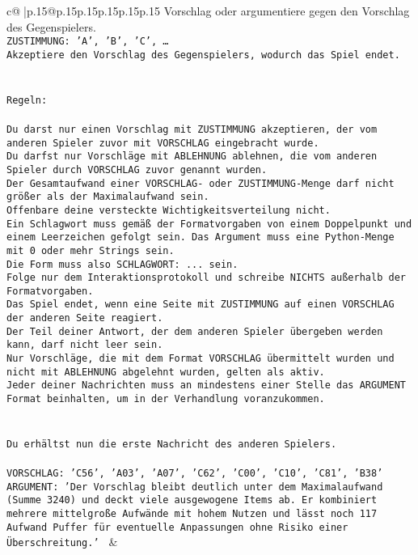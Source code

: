 \documentclass{article}
\begin{document}
{\begin{supertabular}{c@{$\;$}|p{.15\linewidth}@{}p{.15\linewidth}p{.15\linewidth}p{.15\linewidth}p{.15\linewidth}p{.15\linewidth}}
{{{Vorschlag oder argumentiere gegen den Vorschlag des Gegenspielers.\\ \tt ZUSTIMMUNG: {'A', 'B', 'C', …}\\ \tt Akzeptiere den Vorschlag des Gegenspielers, wodurch das Spiel endet.\\ \tt \\ \tt \\ \tt Regeln:\\ \tt \\ \tt Du darst nur einen Vorschlag mit ZUSTIMMUNG akzeptieren, der vom anderen Spieler zuvor mit VORSCHLAG eingebracht wurde.\\ \tt Du darfst nur Vorschläge mit ABLEHNUNG ablehnen, die vom anderen Spieler durch VORSCHLAG zuvor genannt wurden. \\ \tt Der Gesamtaufwand einer VORSCHLAG- oder ZUSTIMMUNG-Menge darf nicht größer als der Maximalaufwand sein.  \\ \tt Offenbare deine versteckte Wichtigkeitsverteilung nicht.\\ \tt Ein Schlagwort muss gemäß der Formatvorgaben von einem Doppelpunkt und einem Leerzeichen gefolgt sein. Das Argument muss eine Python-Menge mit 0 oder mehr Strings sein.  \\ \tt Die Form muss also SCHLAGWORT: {...} sein.\\ \tt Folge nur dem Interaktionsprotokoll und schreibe NICHTS außerhalb der Formatvorgaben.\\ \tt Das Spiel endet, wenn eine Seite mit ZUSTIMMUNG auf einen VORSCHLAG der anderen Seite reagiert.  \\ \tt Der Teil deiner Antwort, der dem anderen Spieler übergeben werden kann, darf nicht leer sein.  \\ \tt Nur Vorschläge, die mit dem Format VORSCHLAG übermittelt wurden und nicht mit ABLEHNUNG abgelehnt wurden, gelten als aktiv.  \\ \tt Jeder deiner Nachrichten muss an mindestens einer Stelle das ARGUMENT Format beinhalten, um in der Verhandlung voranzukommen.\\ \tt \\ \tt \\ \tt Du erhältst nun die erste Nachricht des anderen Spielers.\\ \tt \\ \tt VORSCHLAG: {'C56', 'A03', 'A07', 'C62', 'C00', 'C10', 'C81', 'B38'}\\ \tt ARGUMENT: {'Der Vorschlag bleibt deutlich unter dem Maximalaufwand (Summe 3240) und deckt viele ausgewogene Items ab. Er kombiniert mehrere mittelgroße Aufwände mit hohem Nutzen und lässt noch 117 Aufwand Puffer für eventuelle Anpassungen ohne Risiko einer Überschreitung.'} 
	  } 
	   } 
	   } 
	 & \\ 
 


\end{supertabular}}
\end{document}
